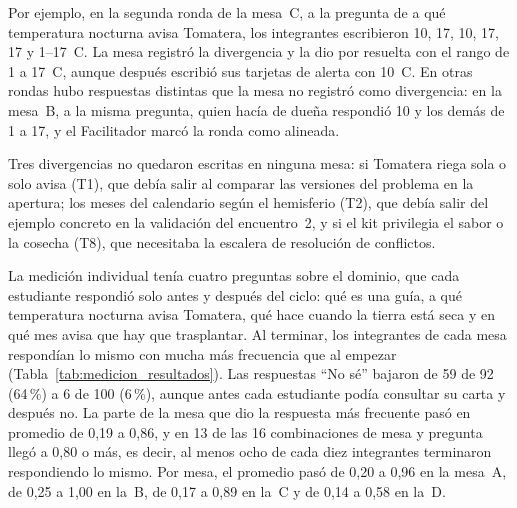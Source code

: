 \documentclass[12pt,letterpaper,oneside]{report}
\begin{document}
Por ejemplo, en la segunda ronda de la mesa~C, a la pregunta de a qué
temperatura nocturna avisa Tomatera, los integrantes escribieron 10, 17, 10, 17,
17 y 1--17~\textdegree C. La mesa registró la divergencia y la dio por resuelta
con el rango de 1 a 17~\textdegree C, aunque después escribió sus tarjetas de
alerta con 10~\textdegree C. En otras rondas hubo respuestas distintas que la
mesa no registró como divergencia: en la mesa~B, a la misma pregunta, quien
hacía de dueña respondió 10 y los demás de 1 a 17, y el Facilitador marcó la
ronda como alineada.

Tres divergencias no quedaron escritas en ninguna mesa: si Tomatera riega sola o
solo avisa (T1), que debía salir al comparar las versiones del problema en la
apertura; los meses del calendario según el hemisferio (T2), que debía salir del
ejemplo concreto en la validación del encuentro~2, y si el kit privilegia el
sabor o la cosecha (T8), que necesitaba la escalera de resolución de conflictos.

La medición individual tenía cuatro preguntas sobre el dominio, que cada
estudiante respondió solo antes y después del ciclo: qué es una guía, a qué
temperatura nocturna avisa Tomatera, qué hace cuando la tierra está seca y en
qué mes avisa que hay que trasplantar. Al terminar, los integrantes de cada mesa
respondían lo mismo con mucha más frecuencia que al empezar
(Tabla~\ref{tab:medicion_resultados}). Las respuestas ``No sé'' bajaron de 59 de
92 (64\,\%) a 6 de 100 (6\,\%), aunque antes cada estudiante podía consultar su
carta y después no. La parte de la mesa que dio la respuesta más frecuente pasó
en promedio de 0,19 a 0,86, y en 13 de las 16 combinaciones de mesa y pregunta
llegó a 0,80 o más, es decir, al menos ocho de cada diez integrantes terminaron
respondiendo lo mismo. Por mesa, el promedio pasó de 0,20 a 0,96 en la mesa~A,
de 0,25 a 1,00 en la~B, de 0,17 a 0,89 en la~C y de 0,14 a 0,58 en la~D.
\end{document}
